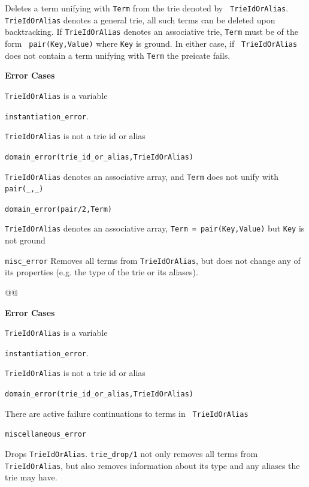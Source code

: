 \begin{description}
%
Deletes a term unifying with {\tt Term} from the trie denoted by {\tt
  TrieIdOrAlias}.  {\tt TrieIdOrAlias} denotes a general trie, all
such terms can be deleted upon backtracking.  If {\tt TrieIdOrAlias}
denotes an associative trie, {\tt Term} must be of the form {\tt
  pair(Key,Value)} where {\tt Key} is ground.  In either case, if {\tt
  TrieIdOrAlias} does not contain a term unifying with {\tt Term} the
preicate fails.

{\bf Error Cases}
\bi
\item 	{\tt TrieIdOrAlias} is a variable
\bi
\item 	{\tt instantiation\_error}.
\ei
\item 	{\tt TrieIdOrAlias} is not a trie id or alias
\bi
\item 	{\tt domain\_error(trie\_id\_or\_alias,TrieIdOrAlias)}
\ei
\item 	{\tt TrieIdOrAlias} denotes an associative array, and {\tt Term} 
  does not unify with {\tt pair(\_,\_)} 
\bi
\item 	{\tt domain\_error(pair/2,Term)}
\ei
\item {\tt TrieIdOrAlias} denotes an associative array, 
  {\tt Term = pair(Key,Value)} but {\tt Key} is not ground 
\bi
\item 	{\tt misc\_error}
\ei
\ei
%
%
Removes all terms from {\tt TrieIdOrAlias}, but does not change any of
its properties (e.g. the type of the trie or its aliases).  

@@

{\bf Error Cases}
\bi
\item 	{\tt TrieIdOrAlias} is a variable
\bi
\item 	{\tt instantiation\_error}.
\ei
\item 	{\tt TrieIdOrAlias} is not a trie id or alias
\bi
\item 	{\tt domain\_error(trie\_id\_or\_alias,TrieIdOrAlias)}
\ei
\item There are active failure continuations to terms in {\tt
  TrieIdOrAlias}
\bi
\item 	{\tt miscellaneous\_error}
\ei
\ei

%
Drops {\tt TrieIdOrAlias}.  {\tt trie\_drop/1} not only removes all
terms from {\tt TrieIdOrAlias}, but also removes information about its
type and any aliases the trie may have.


\end{description}
